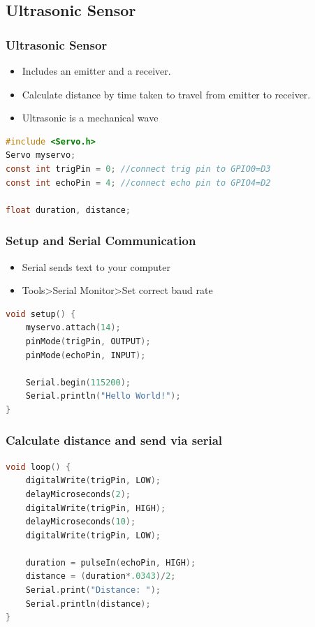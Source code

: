 \documentclass[compress, aspectratio=32]{beamer}
\begin{document}
\subsection{Ultrasonic Sensor}
\begin{frame}[fragile]
    \frametitle{Ultrasonic Sensor}
    \begin{itemize}
        \item Includes an emitter and a receiver.
        \item Calculate distance by time taken to travel from emitter to receiver.
        \item Ultrasonic is a mechanical wave
    \end{itemize}
    \begin{lstlisting}[language=c]
#include <Servo.h>
Servo myservo;
const int trigPin = 0; //connect trig pin to GPIO0=D3
const int echoPin = 4; //connect echo pin to GPIO4=D2

float duration, distance;
    \end{lstlisting}
\end{frame}

\begin{frame}[fragile]
    \frametitle{Setup and Serial Communication}
    \begin{itemize}
        \item Serial sends text to your computer
        \item Tools>Serial Monitor>Set correct baud rate
    \end{itemize}
    \begin{lstlisting}[language=c, firstnumber=last]
void setup() {
    myservo.attach(14);
    pinMode(trigPin, OUTPUT);
    pinMode(echoPin, INPUT);
    
    Serial.begin(115200);
    Serial.println("Hello World!");
}
    \end{lstlisting}
\end{frame}

\begin{frame}[fragile]
    \frametitle{Calculate distance and send via serial}
    \begin{lstlisting}[language=c, firstnumber=last]
void loop() {
    digitalWrite(trigPin, LOW);
    delayMicroseconds(2);
    digitalWrite(trigPin, HIGH);
    delayMicroseconds(10);
    digitalWrite(trigPin, LOW);

    duration = pulseIn(echoPin, HIGH);
    distance = (duration*.0343)/2;
    Serial.print("Distance: ");
    Serial.println(distance);
}
    \end{lstlisting}
\end{frame}
\end{document}
